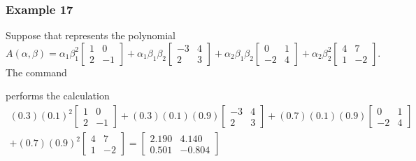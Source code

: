\documentclass[english,11pt]{article}
\theoremstyle{break} \theorembodyfont{\small\rm}
\begin{document}
\subsubsection*{Example 17}

Suppose that  represents the polynomial
\[
 A(\alpha,\beta) = \alpha_1\beta_1^2 \begin{bmatrix} 1 & 0 \\ 2 & -1 \end{bmatrix} +
 \alpha_1\beta_1\beta_2 \begin{bmatrix} -3 & 4 \\ 2 & 3 \end{bmatrix} +
 \alpha_2\beta_1\beta_2 \begin{bmatrix} 0 & 1 \\ -2 & 4 \end{bmatrix} +
 \alpha_2\beta_2^2 \begin{bmatrix} 4 & 7 \\ 1 & -2 \end{bmatrix}.
\]
The command

\vspace{0.5cm}%
\noindent\begin{minipage}{\linewidth}
\end{minipage}
\vspace{0.2cm}

\noindent performs the calculation
\begin{multline*}
 (0.3)(0.1)^2 \begin{bmatrix} 1 & 0 \\ 2 & -1 \end{bmatrix} +
 (0.3)(0.1)(0.9) \begin{bmatrix} -3 & 4 \\ 2 & 3 \end{bmatrix} +
 (0.7)(0.1)(0.9) \begin{bmatrix} 0 & 1 \\ -2 & 4 \end{bmatrix} \\ +
 (0.7)(0.9)^2 \begin{bmatrix} 4 & 7 \\ 1 & -2 \end{bmatrix}  =
 \begin{bmatrix} 2.190 & 4.140 \\ 0.501 & -0.804 \end{bmatrix}
\end{multline*}
\end{document}
